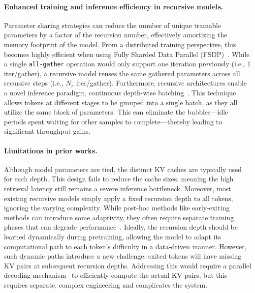 \vspace{-10pt}
\paragraph{Enhanced training and inference efficiency in recursive models.}

Parameter sharing strategies can reduce the number of unique trainable parameters by a factor of the recursion number, effectively amortizing the memory footprint of the model. From a distributed training perspective, this becomes highly efficient when using Fully Sharded Data Parallel (FSDP)~\citep{zhao2023pytorch}. While a single \texttt{all-gather} operation would only support one iteration previously (i.e., 1 iter/gather), a recursive model reuses the same gathered parameters across all recursive steps (i.e., $N_r$ iter/gather). Furthermore, recursive architectures enable a novel inference paradigm, continuous depth-wise batching~\citep{bae2024relaxed, hooper2023speed}. This technique allows tokens at different stages to be grouped into a single batch, as they all utilize the same block of parameters. This can eliminate the bubbles—idle periods spent waiting for other samples to complete—thereby leading to significant throughput gains.


\vspace{-10pt}
\paragraph{Limitations in prior works.}

Although model parameters are tied, the distinct KV caches are typically used for each depth. This design fails to reduce the cache sizes, meaning the high retrieval latency still remains a severe inference bottleneck. Moreover, most existing recursive models simply apply a fixed recursion depth to all tokens, ignoring the varying complexity. While post-hoc methods like early-exiting methods can introduce some adaptivity, they often require separate training phases that can degrade performance~\citep{schuster2022confident, elhoushi2024layerskip, bae2024relaxed}. Ideally, the recursion depth should be learned dynamically during pretraining, allowing the model to adapt its computational path to each token's difficulty in a data-driven manner. However, such dynamic paths introduce a new challenge: exited tokens will have missing KV pairs at subsequent recursion depths. Addressing this would require a parallel decoding mechanism~\citep{bae-etal-2023-fast, elhoushi2024layerskip, kim2023speculative} to efficiently compute the actual KV pairs, but this requires separate, complex engineering and complicates the system. 



